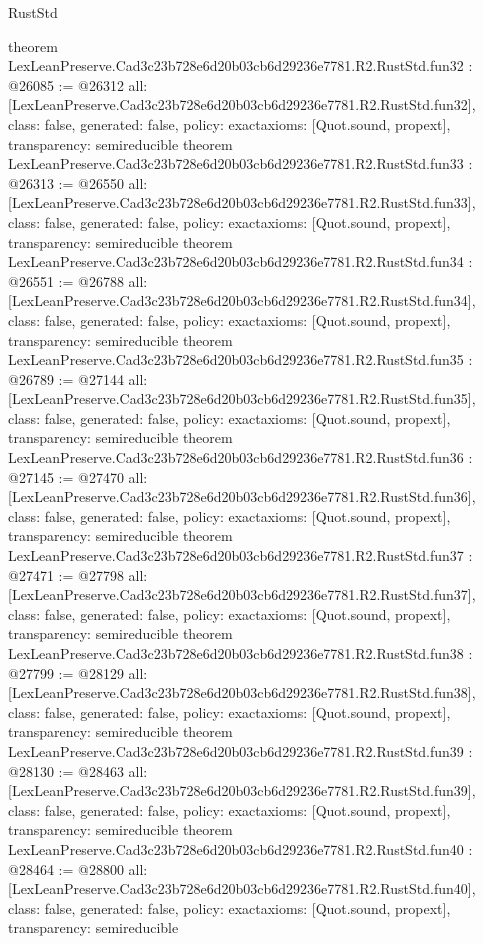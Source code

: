 \begin{lexlean}{RustStd}
\begin{coremodule}
{}
theorem LexLeanPreserve.Cad3c23b728e6d20b03cb6d29236e7781.R2.RustStd.fun32 : @26085 := @26312 {
  all: [LexLeanPreserve.Cad3c23b728e6d20b03cb6d29236e7781.R2.RustStd.fun32],
  class: false,
  generated: false,
  policy: exact{axioms: [Quot.sound, propext]},
  transparency: semireducible
}
theorem LexLeanPreserve.Cad3c23b728e6d20b03cb6d29236e7781.R2.RustStd.fun33 : @26313 := @26550 {
  all: [LexLeanPreserve.Cad3c23b728e6d20b03cb6d29236e7781.R2.RustStd.fun33],
  class: false,
  generated: false,
  policy: exact{axioms: [Quot.sound, propext]},
  transparency: semireducible
}
theorem LexLeanPreserve.Cad3c23b728e6d20b03cb6d29236e7781.R2.RustStd.fun34 : @26551 := @26788 {
  all: [LexLeanPreserve.Cad3c23b728e6d20b03cb6d29236e7781.R2.RustStd.fun34],
  class: false,
  generated: false,
  policy: exact{axioms: [Quot.sound, propext]},
  transparency: semireducible
}
theorem LexLeanPreserve.Cad3c23b728e6d20b03cb6d29236e7781.R2.RustStd.fun35 : @26789 := @27144 {
  all: [LexLeanPreserve.Cad3c23b728e6d20b03cb6d29236e7781.R2.RustStd.fun35],
  class: false,
  generated: false,
  policy: exact{axioms: [Quot.sound, propext]},
  transparency: semireducible
}
theorem LexLeanPreserve.Cad3c23b728e6d20b03cb6d29236e7781.R2.RustStd.fun36 : @27145 := @27470 {
  all: [LexLeanPreserve.Cad3c23b728e6d20b03cb6d29236e7781.R2.RustStd.fun36],
  class: false,
  generated: false,
  policy: exact{axioms: [Quot.sound, propext]},
  transparency: semireducible
}
theorem LexLeanPreserve.Cad3c23b728e6d20b03cb6d29236e7781.R2.RustStd.fun37 : @27471 := @27798 {
  all: [LexLeanPreserve.Cad3c23b728e6d20b03cb6d29236e7781.R2.RustStd.fun37],
  class: false,
  generated: false,
  policy: exact{axioms: [Quot.sound, propext]},
  transparency: semireducible
}
theorem LexLeanPreserve.Cad3c23b728e6d20b03cb6d29236e7781.R2.RustStd.fun38 : @27799 := @28129 {
  all: [LexLeanPreserve.Cad3c23b728e6d20b03cb6d29236e7781.R2.RustStd.fun38],
  class: false,
  generated: false,
  policy: exact{axioms: [Quot.sound, propext]},
  transparency: semireducible
}
theorem LexLeanPreserve.Cad3c23b728e6d20b03cb6d29236e7781.R2.RustStd.fun39 : @28130 := @28463 {
  all: [LexLeanPreserve.Cad3c23b728e6d20b03cb6d29236e7781.R2.RustStd.fun39],
  class: false,
  generated: false,
  policy: exact{axioms: [Quot.sound, propext]},
  transparency: semireducible
}
theorem LexLeanPreserve.Cad3c23b728e6d20b03cb6d29236e7781.R2.RustStd.fun40 : @28464 := @28800 {
  all: [LexLeanPreserve.Cad3c23b728e6d20b03cb6d29236e7781.R2.RustStd.fun40],
  class: false,
  generated: false,
  policy: exact{axioms: [Quot.sound, propext]},
  transparency: semireducible
}
\end{coremodule}
\end{lexlean}
